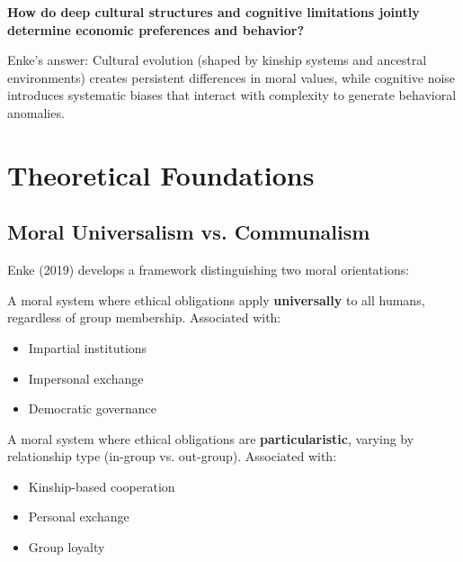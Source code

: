\begin{tcolorbox}[colback=red!5!white, colframe=red!75!black, title=Central Question]
\textbf{How do deep cultural structures and cognitive limitations jointly determine economic preferences and behavior?}
\end{tcolorbox}

Enke's answer: Cultural evolution (shaped by kinship systems and ancestral environments) creates persistent differences in moral values, while cognitive noise introduces systematic biases that interact with complexity to generate behavioral anomalies.

\section{Theoretical Foundations}

\subsection{Moral Universalism vs. Communalism}

Enke (2019) develops a framework distinguishing two moral orientations:

\begin{definition}
A moral system where ethical obligations apply \textbf{universally} to all humans, regardless of group membership. Associated with:
\begin{itemize}
    \item Impartial institutions
    \item Impersonal exchange
    \item Democratic governance
\end{itemize}
\end{definition}

\begin{definition}
A moral system where ethical obligations are \textbf{particularistic}, varying by relationship type (in-group vs. out-group). Associated with:
\begin{itemize}
    \item Kinship-based cooperation
    \item Personal exchange
    \item Group loyalty
\end{itemize}
\end{definition}

